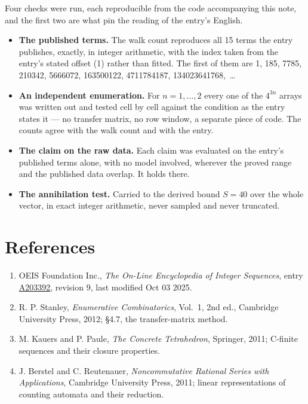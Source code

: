 \documentclass[11pt]{article}
\theoremstyle{definition}
\begin{document}
Four checks were run, each reproducible from the code accompanying this note, and the first two are what pin the reading of the entry's English.

\begin{itemize}

\item {\bfseries The published terms.} The walk count reproduces all 15 terms the entry publishes, exactly, in integer arithmetic, with the index taken from the entry's stated offset (1) rather than fitted. The first of them are 1, 185, 7785, 210342, 5666072, 163500122, 4711784187, 134023641768,~\dots

\item {\bfseries An independent enumeration.} For $n = 1,\dots,2$ every one of the $4^{3n}$ arrays was written out and tested cell by cell against the condition as the entry states it --- no transfer matrix, no row window, a separate piece of code. The counts agree with the walk count and with the entry.

\item {\bfseries The claim on the raw data.} Each claim was evaluated on the entry's published terms alone, with no model involved, wherever the proved range and the published data overlap. It holds there.

\item {\bfseries The annihilation test.} Carried to the derived bound $S = 40$ over the whole vector, in exact integer arithmetic, never sampled and never truncated.

\end{itemize}

\section{References}

\begin{enumerate}

\item OEIS Foundation Inc., \emph{The On-Line Encyclopedia of Integer Sequences}, entry \href{https://oeis.org/A203392}{A203392}, revision 9, last modified Oct 03 2025.

\item R. P. Stanley, \emph{Enumerative Combinatorics}, Vol.~1, 2nd ed., Cambridge University Press, 2012; \S4.7, the transfer-matrix method.

\item M. Kauers and P. Paule, \emph{The Concrete Tetrahedron}, Springer, 2011; C-finite sequences and their closure properties.

\item J. Berstel and C. Reutenauer, \emph{Noncommutative Rational Series with Applications}, Cambridge University Press, 2011; linear representations of counting automata and their reduction.

\end{enumerate}
\end{document}
